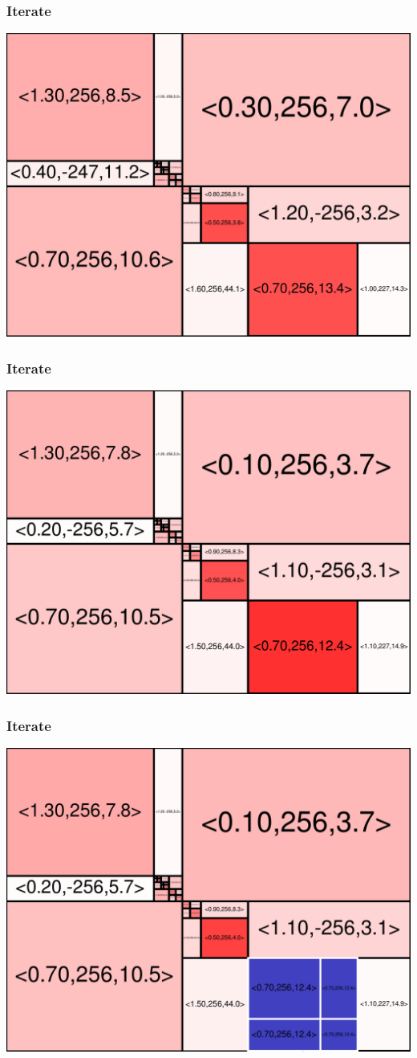 \begin{frame}
\frametitle{Iterate}\begin{centering}\includegraphics[width=8.5 cm]{remy-graph/graph/test33.pdf}

\end{centering}\end{frame}


\begin{frame}
\frametitle{Iterate}\begin{centering}\includegraphics[width=8.5 cm]{remy-graph/graph/test34.pdf}

\end{centering}\end{frame}


\begin{frame}
\frametitle{Iterate}\begin{centering}\includegraphics[width=8.5 cm]{remy-graph/graph/test35.pdf}

\end{centering}\end{frame}


